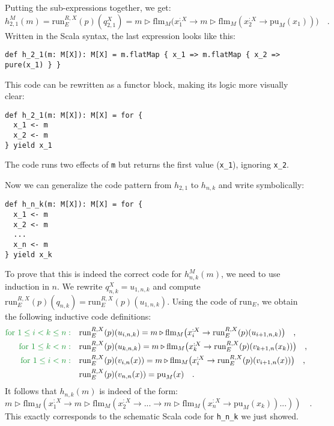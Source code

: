 Putting the sub-expressions together, we get:
\[
h_{2,1}^{M}(m)=\text{run}_{E}^{R,X}(p)(q_{2,1}^{X})=m\triangleright\text{flm}_{M}\big(x_{1}^{:X}\rightarrow m\triangleright\text{flm}_{M}(x_{2}^{:X}\rightarrow\text{pu}_{M}(x_{1}))\big)\quad.
\]
Written in the Scala syntax, the last expression looks like this:
\begin{lstlisting}
def h_2_1(m: M[X]): M[X] = m.flatMap { x_1 => m.flatMap { x_2 => pure(x_1) } }
\end{lstlisting}
This code can be rewritten as a functor block, making its logic more
visually clear:
\begin{lstlisting}
def h_2_1(m: M[X]): M[X] = for {
  x_1 <- m
  x_2 <- m
} yield x_1
\end{lstlisting}
The code runs two effects of \lstinline!m! but returns the first
value (\lstinline!x_1!), ignoring \lstinline!x_2!.

Now we can generalize the code pattern from $h_{2,1}$ to $h_{n,k}$
and write symbolically: 
\begin{lstlisting}
def h_n_k(m: M[X]): M[X] = for {
  x_1 <- m
  x_2 <- m
  ...
  x_n <- m
} yield x_k
\end{lstlisting}

To prove that this is indeed the correct code for $h_{n,k}^{M}(m)$,
we need to use induction in $n$. We rewrite $q_{n,k}^{X}=u_{1,n,k}$
and compute $\text{run}_{E}^{R,X}(p)(q_{n,k})=\text{run}_{E}^{R,X}(p)(u_{1,n,k})$.
Using the code of $\text{run}_{E}$, we obtain the following inductive
code definitions:
\begin{align*}
{\color{greenunder}\text{for }1\le i<k\le n:}\quad & \text{run}_{E}^{R,X}(p)(u_{i,n,k})=m\triangleright\text{flm}_{M}\big(x_{i}^{:X}\rightarrow\text{run}_{E}^{R,X}(p)(u_{i+1,n,k})\big)\quad,\\
{\color{greenunder}\text{for }1\le k<n:}\quad & \text{run}_{E}^{R,X}(p)(u_{k,n,k})=m\triangleright\text{flm}_{M}\big(x_{k}^{:X}\rightarrow\text{run}_{E}^{R,X}(p)(v_{k+1,n}(x_{k}))\big)\quad,\\
{\color{greenunder}\text{for }1\le i<n:}\quad & \text{run}_{E}^{R,X}(p)(v_{i,n}(x))=m\triangleright\text{flm}_{M}\big(x_{i}^{:X}\rightarrow\text{run}_{E}^{R,X}(p)(v_{i+1,n}(x))\big)\quad,\\
 & \text{run}_{E}^{R,X}(p)(v_{n,n}(x))=\text{pu}_{M}(x)\quad.
\end{align*}
It follows that $h_{n,k}(m)$ is indeed of the form:
\[
m\triangleright\text{flm}_{M}(x_{1}^{:X}\rightarrow m\triangleright\text{flm}_{M}(x_{2}^{:X}\rightarrow...\rightarrow m\triangleright\text{flm}_{M}(x_{n}^{:X}\rightarrow\text{pu}_{M}(x_{k}))...))\quad.
\]
This exactly corresponds to the schematic Scala code for \lstinline!h_n_k!
we just showed.

